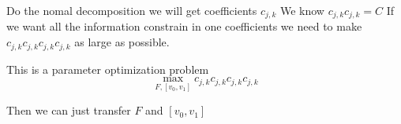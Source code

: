 \documentclass{article}
\theoremstyle{definition} %
\begin{document}
Do the nomal decomposition we will
get coefficients \(c_{j,k}\)
We know \(c_{j,k}c_{j,k}=C\)
If we want all the information
constrain in one coefficients
we need to make
\(c_{j,k}c_{j,k}c_{j,k}c_{j,k}\)
as large as possible.

This is a parameter optimization
problem
\[
    \max_{F,[v_0,v_1]}c_{j,k}c_{j,k}c_{j,k}c_{j,k}
\]

Then we can just transfer \(F\) and \([v_0,v_1]\)






\end{document}
